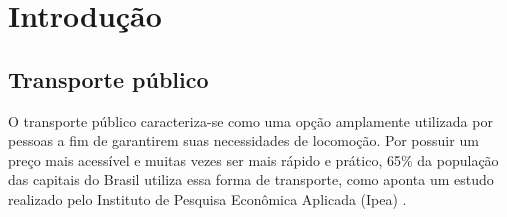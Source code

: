 \chapter{Introdução}
\label{Cap:Intro}
\begin{comment}
\indent
\par Este capítulo apresenta conceitos iniciais do projeto, tais como justificativa, objetivos, panorama econômico, questão central da pesquisa e impactos.
\end{comment}


\section{Transporte público}
\indent
\par O transporte público caracteriza-se como uma opção amplamente utilizada por pessoas a fim de garantirem suas necessidades de locomoção. Por possuir um preço mais acessível e muitas vezes ser mais rápido e prático, 65\% da população das capitais do Brasil utiliza essa forma de transporte, como aponta um estudo realizado pelo Instituto de Pesquisa Econômica Aplicada (Ipea) \cite{Peduzzi2011}.

